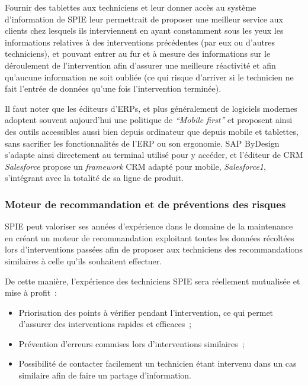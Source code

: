             Fournir des tablettes aux techniciens et leur donner accès au système d'information de SPIE leur permettrait de proposer une meilleur service aux clients chez lesquels ils interviennent en ayant constamment sous les yeux les informations relatives à des interventions précédentes (par eux ou d'autres techniciens), et pouvant entrer au fur et à mesure des informations sur le déroulement de l'intervention afin d'assurer une meilleure réactivité et afin qu'aucune information ne soit oubliée (ce qui risque d'arriver si le technicien ne fait l'entrée de données qu'une fois l'intervention terminée).

            Il faut noter que les éditeurs d'ERPs, et plus généralement de logiciels modernes adoptent souvent aujourd'hui une politique de \textit{``Mobile first''} et proposent ainsi des outils accessibles aussi bien depuis ordinateur que depuis mobile et tablettes, sans sacrifier les fonctionnalités de l'ERP ou son ergonomie. SAP ByDesign s'adapte ainsi directement au terminal utilisé pour y accéder, et l'éditeur de CRM \textit{Salesforce} propose un \textit{framework} CRM adapté pour mobile, \textit{Salesforce1}, s'intégrant avec la totalité de sa ligne de produit.


        \subsubsection{Moteur de recommandation et de préventions des risques}

            SPIE peut valoriser ses années d'expérience dans le domaine de la maintenance en créant un moteur de recommandation exploitant toutes les données récoltées lors d'interventions passées afin de proposer aux techniciens des recommandations similaires à celle qu'ils souhaitent effectuer.

            De cette manière, l'expérience des techniciens SPIE sera réellement mutualisée et mise à profit~:

            \begin{itemize}
                \item Priorisation des points à vérifier pendant l'intervention, ce qui permet d'assurer des interventions rapides et efficaces~;
                \item Prévention d'erreurs commises lors d'interventions similaires~;
                \item Possibilité de contacter facilement un technicien étant intervenu dans un cas similaire afin de faire un partage d'information.
            \end{itemize}

